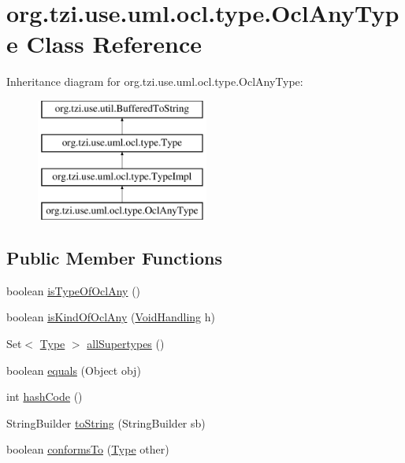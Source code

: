 \hypertarget{classorg_1_1tzi_1_1use_1_1uml_1_1ocl_1_1type_1_1_ocl_any_type}{\section{org.\-tzi.\-use.\-uml.\-ocl.\-type.\-Ocl\-Any\-Type Class Reference}
\label{classorg_1_1tzi_1_1use_1_1uml_1_1ocl_1_1type_1_1_ocl_any_type}
}
Inheritance diagram for org.\-tzi.\-use.\-uml.\-ocl.\-type.\-Ocl\-Any\-Type\-:\begin{figure}[H]
\begin{center}
\leavevmode
\includegraphics[height=4.000000cm]{classorg_1_1tzi_1_1use_1_1uml_1_1ocl_1_1type_1_1_ocl_any_type}
\end{center}
\end{figure}
\subsection*{Public Member Functions}
\begin{DoxyCompactItemize}
\item 
boolean \hyperlink{classorg_1_1tzi_1_1use_1_1uml_1_1ocl_1_1type_1_1_ocl_any_type_a68f728777d8d5b4b90b6ac0a28700780}{is\-Type\-Of\-Ocl\-Any} ()
\item 
boolean \hyperlink{classorg_1_1tzi_1_1use_1_1uml_1_1ocl_1_1type_1_1_ocl_any_type_a9372860dd26a50f4f8ab4d7fa67fb666}{is\-Kind\-Of\-Ocl\-Any} (\hyperlink{enumorg_1_1tzi_1_1use_1_1uml_1_1ocl_1_1type_1_1_type_1_1_void_handling}{Void\-Handling} h)
\item 
Set$<$ \hyperlink{interfaceorg_1_1tzi_1_1use_1_1uml_1_1ocl_1_1type_1_1_type}{Type} $>$ \hyperlink{classorg_1_1tzi_1_1use_1_1uml_1_1ocl_1_1type_1_1_ocl_any_type_a5d7fca7cd396b532b2f8a01b0b72c931}{all\-Supertypes} ()
\item 
boolean \hyperlink{classorg_1_1tzi_1_1use_1_1uml_1_1ocl_1_1type_1_1_ocl_any_type_a5d614c9b20daac3c732526879c2451ac}{equals} (Object obj)
\item 
int \hyperlink{classorg_1_1tzi_1_1use_1_1uml_1_1ocl_1_1type_1_1_ocl_any_type_aa9ec5c3f87991096fdaeae6932c343b3}{hash\-Code} ()
\item 
String\-Builder \hyperlink{classorg_1_1tzi_1_1use_1_1uml_1_1ocl_1_1type_1_1_ocl_any_type_a7c0c9ea7d3ce663fbea4259f006fabdf}{to\-String} (String\-Builder sb)
\item 
boolean \hyperlink{classorg_1_1tzi_1_1use_1_1uml_1_1ocl_1_1type_1_1_ocl_any_type_af901b50b6ca215c4510e0eeeced34b79}{conforms\-To} (\hyperlink{interfaceorg_1_1tzi_1_1use_1_1uml_1_1ocl_1_1type_1_1_type}{Type} other)
\end{DoxyCompactItemize}


